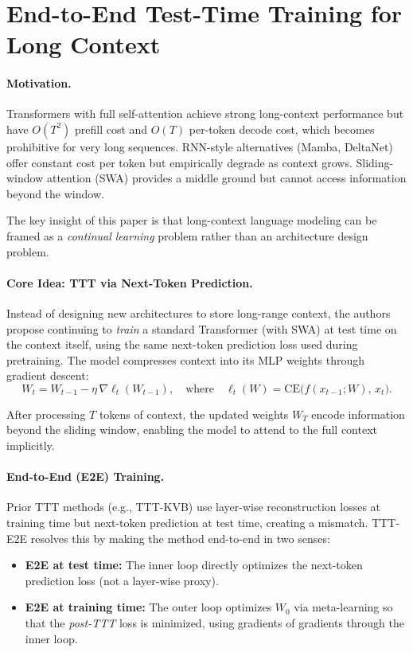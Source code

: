 \documentclass[12pt]{article}
\begin{document}
\psetheader %

\section*{End-to-End Test-Time Training for Long Context}

\paragraph{Motivation.}
Transformers with full self-attention achieve strong long-context performance but
have $O(T^2)$ prefill cost and $O(T)$ per-token decode cost, which becomes
prohibitive for very long sequences. RNN-style alternatives (Mamba, DeltaNet)
offer constant cost per token but empirically degrade as context grows.
Sliding-window attention (SWA) provides a middle ground but cannot access
information beyond the window.

The key insight of this paper is that long-context language modeling can be
framed as a \emph{continual learning} problem rather than an architecture
design problem.

\paragraph{Core Idea: TTT via Next-Token Prediction.}
Instead of designing new architectures to store long-range context, the authors
propose continuing to \emph{train} a standard Transformer (with SWA) at test
time on the context itself, using the same next-token prediction loss used
during pretraining. The model compresses context into its MLP weights through
gradient descent:
\[
		W_t = W_{t-1} - \eta \, \nabla \ell_t(W_{t-1}),
		\quad \text{where} \quad
		\ell_t(W) = \mathrm{CE}\bigl(f(x_{t-1}; W),\, x_t\bigr).
\]

After processing $T$ tokens of context, the updated weights $W_T$ encode
information beyond the sliding window, enabling the model to attend to the
full context implicitly.

\paragraph{End-to-End (E2E) Training.}
Prior TTT methods (e.g., TTT-KVB) use layer-wise reconstruction losses at
training time but next-token prediction at test time, creating a mismatch.
TTT-E2E resolves this by making the method end-to-end in two senses:

\begin{itemize}
		\item \textbf{E2E at test time:} The inner loop directly optimizes the
				next-token prediction loss (not a layer-wise proxy).
		\item \textbf{E2E at training time:} The outer loop optimizes $W_0$ via
				meta-learning so that the \emph{post-TTT} loss is minimized, using
				gradients of gradients through the inner loop.
\end{itemize}
\end{document}
